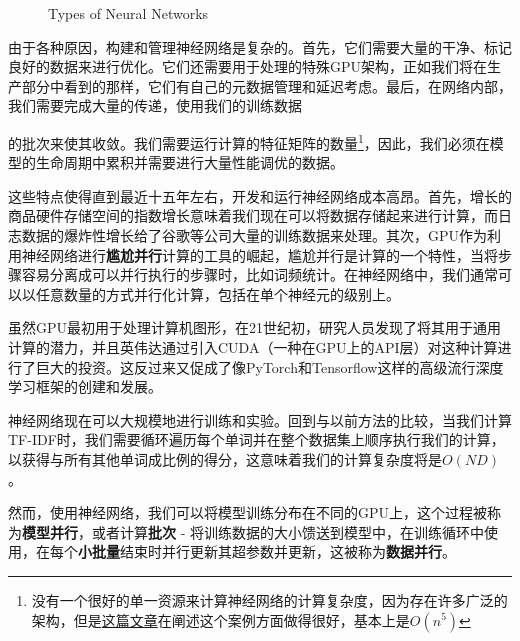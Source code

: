 \documentclass[Chinese, 11pt, table]{diazessay} %
\begin{document}
\begin{CJK}{UTF8}{gbsn}
\begin{sloppypar}
\begin{figure}[H]
\centering
{}
\caption{Types of Neural Networks}
\end{figure}

由于各种原因，构建和管理神经网络是复杂的。首先，它们需要大量的干净、标记良好的数据来进行优化。它们还需要用于处理的特殊GPU架构，正如我们将在生产部分中看到的那样，它们有自己的元数据管理和延迟考虑。最后，在网络内部，我们需要完成大量的传递，使用我们的训练数据

的批次来使其收敛。我们需要运行计算的特征矩阵的数量\footnote{没有一个很好的单一资源来计算神经网络的计算复杂度，因为存在许多广泛的架构，但是\href{https://lunalux.io/computational-complexity-of-neural-networks/}{这篇文章}在阐述这个案例方面做得很好，基本上是$O(n^5)$}，因此，我们必须在模型的生命周期中累积并需要进行大量性能调优的数据。

这些特点使得直到最近十五年左右，开发和运行神经网络成本高昂。首先，增长的商品硬件存储空间的指数增长意味着我们现在可以将数据存储起来进行计算，而日志数据的爆炸性增长给了谷歌等公司大量的训练数据来处理。其次，GPU作为利用神经网络进行\textbf{尴尬并行}计算的工具的崛起，尴尬并行是计算的一个特性，当将步骤容易分离成可以并行执行的步骤时，比如词频统计。在神经网络中，我们通常可以以任意数量的方式并行化计算，包括在单个神经元的级别上。

虽然GPU最初用于处理计算机图形，在21世纪初，研究人员发现了将其用于通用计算的潜力，并且英伟达通过引入CUDA（一种在GPU上的API层）对这种计算进行了巨大的投资。这反过来又促成了像PyTorch和Tensorflow这样的高级流行深度学习框架的创建和发展。

神经网络现在可以大规模地进行训练和实验。回到与以前方法的比较，当我们计算TF-IDF时，我们需要循环遍历每个单词并在整个数据集上顺序执行我们的计算，以获得与所有其他单词成比例的得分，这意味着我们的计算复杂度将是$O(N D)$\citep{cong2016novel}。

然而，使用神经网络，我们可以将模型训练分布在不同的GPU上，这个过程被称为\textbf{模型并行}，或者计算\textbf{批次} - 将训练数据的大小馈送到模型中，在训练循环中使用，在每个\textbf{小批量}结束时并行更新其超参数并更新，这被称为\textbf{数据并行}\citep{shallue2018measuring}。


\end{sloppypar}
\end{CJK}
\end{document}
